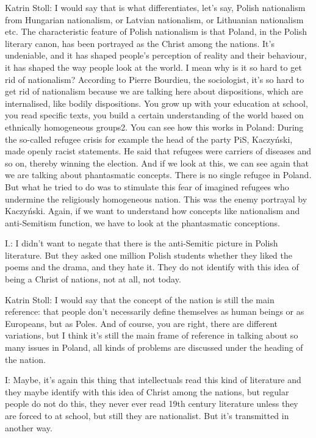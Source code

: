 Katrin Stoll: I would say that is what differentiates, let’s say, Polish nationalism from Hungarian nationalism, or Latvian nationalism, or Lithuanian nationalism etc. The characteristic feature of Polish nationalism is that Poland, in the Polish literary canon, has been portrayed as the Christ among the nations. It’s undeniable, and it has shaped people’s perception of reality and their behaviour, it has shaped the way people look at the world. I mean why is it so hard to get rid of nationalism? According to Pierre Bourdieu, the sociologist, it’s so hard to get rid of nationalism because we are talking here about dispositions, which are internalised, like bodily dispositions. You grow up with your education at school, you read specific texts, you build a certain understanding of the world based on ethnically homogeneous groups2. You can see how this works in Poland: During the so-called refugee crisis for example the head of the party PiS, Kaczyński, made openly racist statements. He said that refugees were carriers of diseases and so on, thereby winning the election. And if we look at this, we can see again that we are talking about phantasmatic concepts. There is no single refugee in Poland. But what he tried to do was to stimulate this fear of imagined refugees who undermine the religiously homogeneous nation. This was the enemy portrayal by Kaczyński. Again, if we want to understand how concepts like nationalism and anti-Semitism function, we have to look at the phantasmatic conceptions. 

 

I.: I didn’t want to negate that there is the anti-Semitic picture in Polish literature. But they asked one million Polish students whether they liked the poems and the drama, and they hate it. They do not identify with this idea of being a Christ of nations, not at all, not today. 

 

Katrin Stoll:  I would say that the concept of the nation is still the main reference: that people don’t necessarily define themselves as human beings or as Europeans, but as Poles. And of course, you are right, there are different variations, but I think it’s still the main frame of reference in talking about so many issues in Poland, all kinds of problems are discussed under the heading of the nation. 

 

I: Maybe, it’s again this thing that intellectuals read this kind of literature and they maybe identify with this idea of Christ among the nations, but regular people do not do this, they never ever read 19th century literature unless they are forced to at school, but still they are nationalist. But it’s transmitted in another way. 

